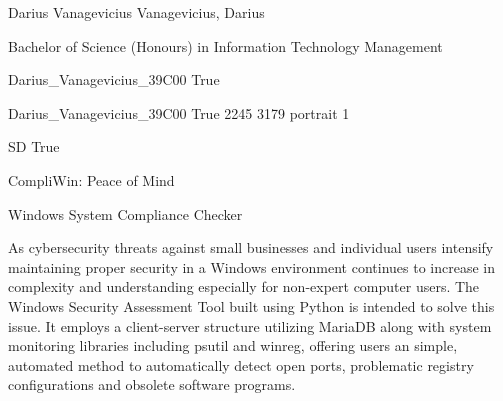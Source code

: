 \documentclass[twoside]{report}
\begin{document}
\begingroup{}\relax



\def\Key{Darius_Vanagevicius_39C00}

{Darius Vanagevicius}
{Vanagevicius, Darius}

{Bachelor of Science (Honours) in Information Technology Management}

{Darius_Vanagevicius_39C00}
{True}

{Darius_Vanagevicius_39C00}
{True}
{2245}
{3179}
{portrait}
{1}

{SD}
{True}

{CompliWin: Peace of Mind}

{Windows System Compliance Checker}

{As cybersecurity threats against small businesses and individual users intensify maintaining proper
security in a Windows environment continues to increase in complexity and understanding especially
for non-expert computer users. The Windows Security Assessment Tool built using Python is
intended to solve this issue. It employs a client-server structure utilizing MariaDB along with system
monitoring libraries including psutil and winreg, offering users an simple, automated method to
automatically detect open ports, problematic registry configurations and obsolete software programs.}
\end{document}
